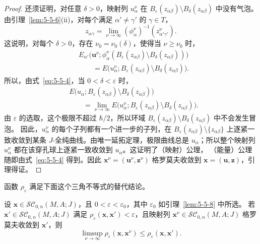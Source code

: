 \begin{proof}
还须证明，对任意 $\delta>0$，映射列 $u_\alpha^\nu$ 在
$B_\varepsilon(z_{\alpha\beta})\setminus B_\delta(z_{\alpha\beta})$ 中没有气泡。
由引理~\ref{lem:5-5-6}(ii)，对每个满足 $\alpha'\ne\gamma'$ 的 $\gamma\in T$，
\[
  z_{\alpha\gamma}
  =\lim_{\nu\to\infty}
  (\phi_\alpha^\nu)^{-1}(z_{\alpha'\gamma'}^\nu).
\]
这说明，对每个 $\delta>0$，存在 $\nu_0=\nu_0(\delta)$，使得当
$\nu\ge\nu_0$ 时，
\[
  \begin{aligned}
  &E_{\alpha'}\bigl(\mathbf u^\nu;
    \phi_\alpha^\nu(
      B_\varepsilon(z_{\alpha\beta})
      \setminus B_\delta(z_{\alpha\beta}))\bigr)\\
  &\qquad
  =E\bigl(u_\alpha^\nu;
      B_\varepsilon(z_{\alpha\beta})
      \setminus B_\delta(z_{\alpha\beta})\bigr).
  \end{aligned}
\]
所以，由式~\eqref{eq:5-5-4}，当 $0<\delta<\varepsilon$ 时，
\[
  \begin{aligned}
  &E\bigl(u_\alpha;
    B_\varepsilon(z_{\alpha\beta})
    \setminus B_\delta(z_{\alpha\beta})\bigr)\\
  &\qquad
  =\lim_{\nu\to\infty}
   E\bigl(u_\alpha^\nu;
    B_\varepsilon(z_{\alpha\beta})
    \setminus B_\delta(z_{\alpha\beta})\bigr).
  \end{aligned}
\]
由 $\varepsilon$ 的选取，这个极限不超过 $\hbar/2$，所以环域
$B_\varepsilon(z_{\alpha\beta})\setminus B_\delta(z_{\alpha\beta})$ 中不会发生冒泡。
因此，$u_\alpha^\nu$ 的每个子列都有一个进一步的子列，在
$B_\varepsilon(z_{\alpha\beta})\setminus\{z_{\alpha\beta}\}$ 上逐紧一致收敛到某条
$J$-全纯曲线。由唯一延拓定理，极限曲线总是 $u_\alpha$；所以整个映射列
$u_\alpha^\nu$ 都在该穿孔球上逐紧一致收敛到 $u_\alpha$。这证明了（映射）公理，
（能量）公理随即由式~\eqref{eq:5-5-4} 得到。因此
$\mathbf x^\nu=(\mathbf u^\nu,\mathbf z^\nu)$ 格罗莫夫收敛到
$\mathbf x=(\mathbf u,\mathbf z)$，引理得证。
\end{proof}

函数 $\rho_\varepsilon$ 满足下面这个三角不等式的替代结论。

\begin{lemma}\label{lem:5-5-9}
设 $\mathbf x\in\mathcal{SC}_{0,n}(M,A;J)$，且
$0<\varepsilon<\varepsilon_0$，其中 $\varepsilon_0$ 如引理~\ref{lem:5-5-8} 中所选。
若 $\mathbf x'\in\mathcal{SC}_{0,n}(M,A;J)$ 满足
$\rho_\varepsilon(\mathbf x,\mathbf x')<\varepsilon$，且映射列
$\mathbf x^\nu\in\mathcal{SC}_{0,n}(M,A;J)$ 格罗莫夫收敛到 $\mathbf x'$，则
\[
  \limsup_{\nu\to\infty}
  \rho_\varepsilon(\mathbf x,\mathbf x^\nu)
  \le\rho_\varepsilon(\mathbf x,\mathbf x').
\]
\end{lemma}

